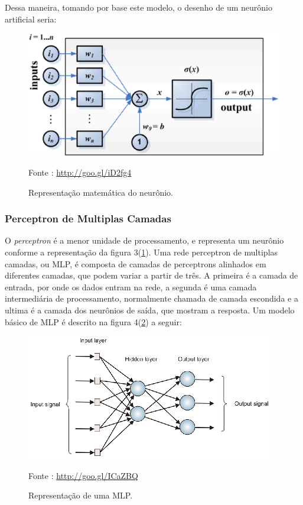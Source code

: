     Dessa maneira, tomando por base este modelo, o desenho de um neurônio artificial seria:

    \begin{figure}[h]
        \centering
        \label{fig03}
            \includegraphics[keepaspectratio=true, scale=0.4]{editaveis/images/modeloNeuronio.eps}
        \caption{Representação matemática do neurônio.}
        Fonte : \url{http://goo.gl/iD2fg4}
    \end{figure}

\subsubsection{Perceptron de Multiplas Camadas}
    O \textit{perceptron} é a menor unidade de processamento, e representa um neurônio conforme a representação da figura 3(\ref{fig03}). Uma rede perceptron de multiplas camadas, ou MLP, é composta de camadas de perceptrons alinhados em diferentes camadas, que podem variar a partir de três. A primeira é a camada de entrada, por onde os dados entram na rede, a segunda é uma camada intermediária de processamento, normalmente chamada de camada escondida e a ultima é a camada dos neurônios de saída, que mostram a resposta. Um modelo básico de MLP é descrito na figura 4(\ref{fig04}) a seguir:

    \begin{figure}[h]
        \centering
        \label{fig04}
            \includegraphics[keepaspectratio=true, scale=0.4]{editaveis/images/mlp.eps}
        \caption{Representação de uma MLP.}
        Fonte : \url{http://goo.gl/ICaZBQ}
    \end{figure}


